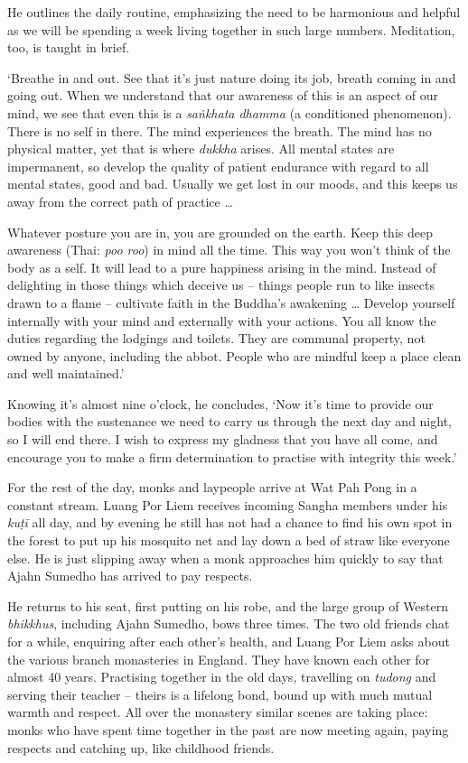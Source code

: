 He outlines the daily routine, emphasizing the need to be harmonious and
helpful as we will be spending a week living together in such large
numbers. Meditation, too, is taught in brief.

`Breathe in and out. See that it's just nature doing its job, breath
coming in and going out. When we understand that our awareness of this
is an aspect of our mind, we see that even this is a
\emph{saṅkhata dhamma} (a conditioned phenomenon). There is no self in
there. The mind experiences the breath. The mind has no physical matter, 
yet that is where \emph{dukkha} arises. All mental states are
impermanent, so develop the quality of patient endurance with regard to
all mental states, good and bad. Usually we get lost in our moods, and
this keeps us away from the correct path of practice \ldots{}

Whatever posture you are in, you are grounded on the earth. Keep this
deep awareness (Thai: \emph{poo roo}) in mind all the time. This way you
won't think of the body as a self. It will lead to a pure happiness
arising in the mind. Instead of delighting in those things which deceive
us -- things people run to like insects drawn to a flame -- cultivate
faith in the Buddha's awakening \ldots{} Develop yourself internally
with your mind and externally with your actions. You all know the duties
regarding the lodgings and toilets. They are communal property, not
owned by anyone, including the abbot. People who are mindful keep a
place clean and well maintained.'

Knowing it's almost nine o'clock, he concludes, `Now it's time to
provide our bodies with the sustenance we need to carry us through the
next day and night, so I will end there. I wish to express my gladness
that you have all come, and encourage you to make a firm determination
to practise with integrity this week.'

For the rest of the day, monks and laypeople arrive at Wat Pah Pong in a
constant stream. Luang Por Liem receives incoming Sangha members under
his \emph{kuṭī} all day, and by evening he still has not had a chance to
find his own spot in the forest to put up his mosquito net and lay down
a bed of straw like everyone else. He is just slipping away when a monk
approaches him quickly to say that Ajahn Sumedho has arrived to pay
respects.

He returns to his seat, first putting on his robe, and the large group
of Western \emph{bhikkhus}, including Ajahn Sumedho, bows three times. 
The two old friends chat for a while, enquiring after each other's
health, and Luang Por Liem asks about the various branch monasteries in
England. They have known each other for almost 40 years. Practising
together in the old days, travelling on \emph{tudong} and serving their
teacher -- theirs is a lifelong bond, bound up with much mutual warmth
and respect. All over the monastery similar scenes are taking place: 
monks who have spent time together in the past are now meeting again, 
paying respects and catching up, like childhood friends. 

